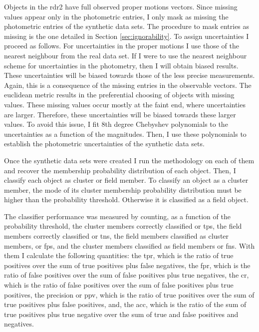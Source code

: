 Objects in the \gls{rdr2}  have full observed proper motions vectors. Since missing values appear only in the photometric entries, I only mask as missing the photometric entries of the synthetic data sets. The procedure to mask entries as missing is the one detailed in Section \ref{sec:ignorability}.
To assign uncertainties I proceed as follows. For uncertainties in the proper motions I use those of the nearest neighbour from the real data set. If I were to use the nearest neighbour scheme for uncertainties in the photometry, then I will obtain biased results. These uncertainties will be biased towards those of the less precise measurements. Again, this is a consequence of the missing entries in the observable vectors. The euclidean metric results in the preferential choosing of objects with missing values. These missing values occur mostly at the faint end, where uncertainties are larger. Therefore, these uncertainties will be biased towards these larger values. To avoid this issue, I fit 8th degree Chebyshev polynomials to the uncertainties as a function of the magnitudes. Then, I use these polynomials to establish the photometric uncertainties of the synthetic data sets.

Once the synthetic data sets were created I run the methodology on each of them and recover the membership probability distribution of each object. Then, I classify each object as cluster or field member. To classify an object as a cluster member, the mode of its cluster membership probability distribution must be higher than the probability threshold. Otherwise it is classified as a field object. 

The classifier performance was measured by counting, as a function of the probability threshold, the cluster members correctly classified or \glspl{tp}, the field members correctly classified or \glspl{tn}, the field members classified as cluster members, or \glspl{fp}, and the cluster members classified as field members or \glspl{fn}. With them I calculate the following quantities: the \gls{tpr}, which is the ratio of true positives over the sum of true positives plus false negatives, the \gls{fpr}, which is the ratio of false positives over the sum of false positives plus true negatives, the \gls{cr}, which is the ratio of false positives over the sum of false positives plus true positives, the precision or \gls{ppv}, which is the ratio of true positives over the sum of true positives plus false positives, and, the \gls{acc}, which is the ratio of the sum of true positives plus true negative over the sum of true and false positives and negatives. 

